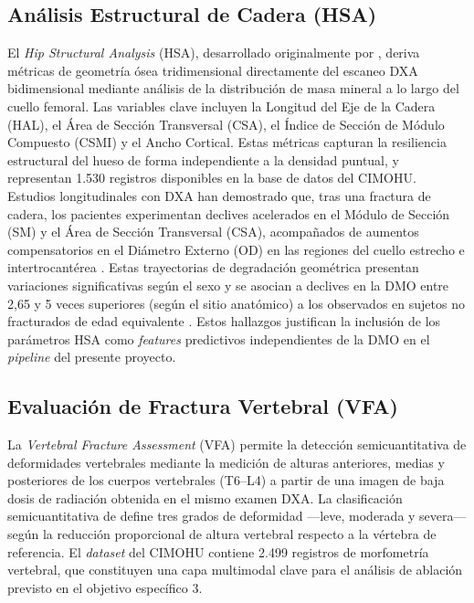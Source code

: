 \documentclass[../tesis.tex]{subfiles}
\begin{document}
\subsection{Análisis Estructural de Cadera (HSA)}
\label{subsec:hsa}

El \textit{Hip Structural Analysis} (HSA), desarrollado originalmente por \textcite{Beck1990},
deriva métricas de geometría ósea tridimensional directamente del escaneo DXA bidimensional
mediante análisis de la distribución de masa mineral a lo largo del cuello femoral.
Las variables clave incluyen la Longitud del Eje de la Cadera (HAL), el Área de Sección
Transversal (CSA), el Índice de Sección de Módulo Compuesto (CSMI) y el Ancho Cortical.
Estas métricas capturan la resiliencia estructural del hueso de forma independiente a la densidad
puntual, y representan 1.530 registros disponibles en la base de datos del CIMOHU.
Estudios longitudinales con DXA han demostrado que, tras una fractura de cadera, los pacientes
experimentan declives acelerados en el Módulo de Sección (SM) y el Área de Sección Transversal
(CSA), acompañados de aumentos compensatorios en el Diámetro Externo (OD) en las regiones del
cuello estrecho e intertrocantérea \cite{Rathbun2020_HSA}.
Estas trayectorias de degradación geométrica presentan variaciones significativas según el sexo
\cite{Rathbun2016_Sex} y se asocian a declives en la DMO entre 2{,}65 y 5 veces superiores (según el sitio anatómico) a los
observados en sujetos no fracturados de edad equivalente \cite{Rathbun2018_BMD}.
Estos hallazgos justifican la inclusión de los parámetros HSA como \textit{features} predictivos
independientes de la DMO en el \textit{pipeline} del presente proyecto.

\subsection{Evaluación de Fractura Vertebral (VFA)}
\label{subsec:vfa}

La \textit{Vertebral Fracture Assessment} (VFA) permite la detección semicuantitativa de
deformidades vertebrales mediante la medición de alturas anteriores, medias y posteriores de los
cuerpos vertebrales (T6--L4) a partir de una imagen de baja dosis de radiación obtenida en el
mismo examen DXA.
La clasificación semicuantitativa de \textcite{Genant1993} define tres grados de deformidad
---leve, moderada y severa--- según la reducción proporcional de altura vertebral respecto a la
vértebra de referencia.
El \textit{dataset} del CIMOHU contiene 2.499 registros de morfometría vertebral, que constituyen
una capa multimodal clave para el análisis de ablación previsto en el objetivo específico 3.
\end{document}
